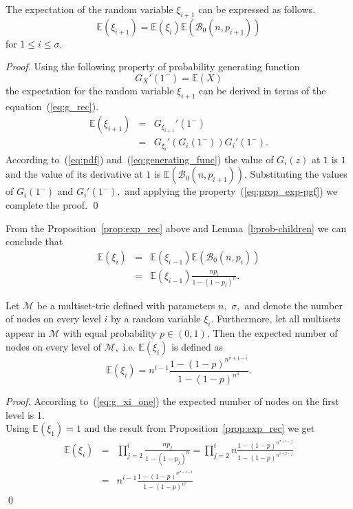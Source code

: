 \begin{proposition}\label{prop:exp_rec}
The expectation of the random variable $\xi_{i+1}$ can be expressed 
as follows.
\[
\mathbb{E}(\xi_{i+1}) = \mathbb{E}(\xi_i)\mathbb{E}(\mathcal{B}_0(n,p_{i+1}))
\]
for $1\leq i\leq\sigma.$
\end{proposition}
\begin{proof}
Using the following property of probability generating function
\begin{equation}\label{eq:prop_exp-pgf}
G_X'(1^-) = \mathbb{E}(X)
\end{equation}
the expectation for the random variable $\xi_{i+1}$ can be derived in terms of 
the equation~(\ref{eq:g_rec}).
\begin{eqnarray}\label{eq:exp}
\mathbb{E}(\xi_{i+1}) &=& G_{\xi_{i+1}}'(1^-) \nonumber \\
&=& G_{\xi_i}'(G_i(1^-))G_i'(1^-).
\end{eqnarray}
According to~(\ref{eq:pdf}) and~(\ref{eq:generating_func}) the value of $G_i(z)$ at 
$1$ is $1$ and the value of its derivative at $1$ is $\mathbb{E}(\mathcal{B}_0(n,p_{i+1})).$ 
Substituting the values of $G_i(1^-)$ and $G_i'(1^-),$ and applying the 
property~(\ref{eq:prop_exp-pgf}) we complete the proof.
\hspace*{\fill}\qed
\end{proof}
%
From the Proposition~\ref{prop:exp_rec} above and Lemma~\ref{l:prob-children} we 
can conclude that 
\begin{eqnarray}
\mathbb{E}(\xi_{i}) &=& \mathbb{E}(\xi_{i-1})\mathbb{E}\left( \mathcal{B}_0(n,p_{i}) \right) \nonumber \\
& = & \mathbb{E}(\xi_{i-1})\frac{np_{i}}{1-(1-p_{i})^n}.
\end{eqnarray}

\begin{theorem}\label{thm:exp_level}
Let $\mathcal{M}$ be a multiset-trie defined with parameters $n,$ $\sigma,$ and denote the number 
of nodes on every level $i$ by a random variable $\xi_i.$ Furthermore, let all multisets appear in 
$\mathcal{M}$ with equal probability $p\in (0,1).$ Then the expected number 
of nodes on every level of $\mathcal{M},$ i.e. $\mathbb{E}(\xi_i)$ is defined as 
\begin{equation}\label{eq:nodes_level}
\mathbb{E}(\xi_{i}) = n^{i-1} \frac{1-(1-p)^{n^{\sigma +1 -i}}}{1-(1-p)^{n^{\sigma}}}.
\end{equation}
\end{theorem}
\begin{proof}
According to~(\ref{eq:g_xi_one}) the expected number of nodes on the first level is 1. \\
Using $\mathbb{E}(\xi_1) = 1$ and the result from Proposition~\ref{prop:exp_rec}
we get
\begin{eqnarray*}
\mathbb{E}(\xi_{i}) &=& \prod_{j=2}^{i} \frac{n p_j}{1-(1-p_j)^n}
= \prod_{j=2}^{i} n \frac{1-(1-p)^{n^{\sigma +1-j}}}{1-(1-p)^{n^{\sigma + 2 -j}}} \\
&=& n^{i-1} \frac{1-(1-p)^{n^{\sigma +1 -i}}}{1-(1-p)^{n^{\sigma}}}
\end{eqnarray*}
\hspace*{\fill}\qed
\end{proof}

